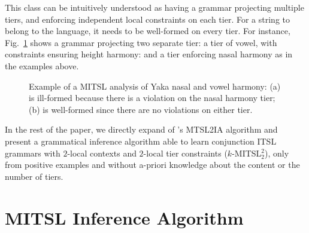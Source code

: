\documentclass[11pt,a4paper]{article}
\begin{document}
This class can be intuitively understood as having a grammar projecting multiple tiers, and enforcing independent local constraints on each tier.
For a string to belong to the language, it needs to be well-formed on every tier.
For instance, Fig.~\ref{fig:YAKA3} shows a grammar projecting two separate tier: a tier of vowel, with constraints ensuring height harmony: and a tier enforcing nasal harmony as in the examples above.


\begin{figure}[]
\begin{center}
       
    
        \end{center}
        \caption{Example of a MITSL analysis of  Yaka nasal and vowel harmony: (a) is ill-formed because there is a violation on the nasal harmony tier; (b) is well-formed since there are no violations on either tier.}
        \label{fig:YAKA3}
        \end{figure}


In the rest of the paper, we directly expand of \citet{McMullinSCIL2019}'s MTSL2IA algorithm and present a grammatical inference algorithm able to learn conjunction ITSL grammars with $2$-local contexts and $2$-local tier constraints ($k$-MITSL$^2_2$), only from positive examples and without a-priori knowledge about the content or the number of tiers.


\section{MITSL Inference Algorithm}
\end{document}
